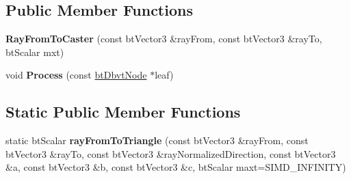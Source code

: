 \subsection*{Public Member Functions}
\begin{DoxyCompactItemize}
\item 
\mbox{\label{structbtSoftBody_1_1RayFromToCaster_a24b9d523391dbc0bc3e01b7dba4aaa13}} 
{\bfseries Ray\+From\+To\+Caster} (const bt\+Vector3 \&ray\+From, const bt\+Vector3 \&ray\+To, bt\+Scalar mxt)
\item 
\mbox{\label{structbtSoftBody_1_1RayFromToCaster_a621df5173379b16c357db2bdc0193b5a}} 
void {\bfseries Process} (const \hyperlink{structbtDbvtNode}{bt\+Dbvt\+Node} $\ast$leaf)
\end{DoxyCompactItemize}
\subsection*{Static Public Member Functions}
\begin{DoxyCompactItemize}
\item 
\mbox{\label{structbtSoftBody_1_1RayFromToCaster_a65b5c54f01dd39409b9b743982e8ef01}} 
static bt\+Scalar {\bfseries ray\+From\+To\+Triangle} (const bt\+Vector3 \&ray\+From, const bt\+Vector3 \&ray\+To, const bt\+Vector3 \&ray\+Normalized\+Direction, const bt\+Vector3 \&a, const bt\+Vector3 \&b, const bt\+Vector3 \&c, bt\+Scalar maxt=S\+I\+M\+D\+\_\+\+I\+N\+F\+I\+N\+I\+TY)
\end{DoxyCompactItemize}
